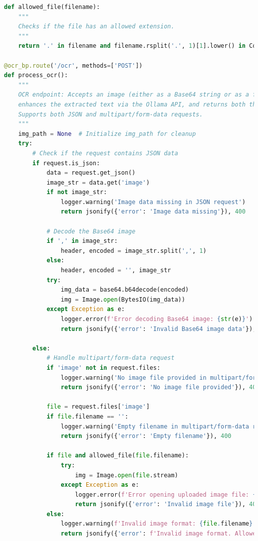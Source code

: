 \begin{lstlisting}[language=Python]
def allowed_file(filename):
    """
    Checks if the file has an allowed extension.
    """
    return '.' in filename and filename.rsplit('.', 1)[1].lower() in Config.ALLOWED_EXTENSIONS

@ocr_bp.route('/ocr', methods=['POST'])
def process_ocr():
    """
    OCR endpoint: Accepts an image (either as a Base64 string or as a file), extracts text using OCR,
    enhances the extracted text via the Ollama API, and returns both the raw and improved text.
    Supports both JSON and multipart/form-data requests.
    """
    img_path = None  # Initialize img_path for cleanup
    try:
        # Check if the request contains JSON data
        if request.is_json:
            data = request.get_json()
            image_str = data.get('image')
            if not image_str:
                logger.warning('Image data missing in JSON request')
                return jsonify({'error': 'Image data missing'}), 400

            # Decode the Base64 image
            if ',' in image_str:
                header, encoded = image_str.split(',', 1)
            else:
                header, encoded = '', image_str
            try:
                img_data = base64.b64decode(encoded)
                img = Image.open(BytesIO(img_data))
            except Exception as e:
                logger.error(f'Error decoding Base64 image: {str(e)}')
                return jsonify({'error': 'Invalid Base64 image data'}), 400

        else:
            # Handle multipart/form-data request
            if 'image' not in request.files:
                logger.warning('No image file provided in multipart/form-data request')
                return jsonify({'error': 'No image file provided'}), 400

            file = request.files['image']
            if file.filename == '':
                logger.warning('Empty filename in multipart/form-data request')
                return jsonify({'error': 'Empty filename'}), 400

            if file and allowed_file(file.filename):
                try:
                    img = Image.open(file.stream)
                except Exception as e:
                    logger.error(f'Error opening uploaded image file: {str(e)}')
                    return jsonify({'error': 'Invalid image file'}), 400
            else:
                logger.warning(f'Invalid image format: {file.filename}')
                return jsonify({'error': f'Invalid image format. Allowed: {", ".join(Config.ALLOWED_EXTENSIONS)}'}), 400


\end{lstlisting}
